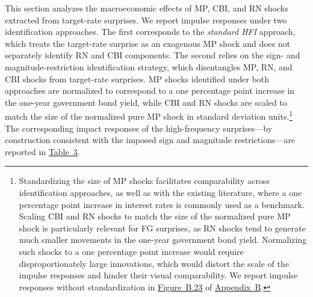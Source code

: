 \documentclass[12pt, reqno]{article}
\begin{document}
This section analyzes the macroeconomic effects of MP, CBI, and RN shocks extracted from target-rate surprises. We report impulse responses under two identification approaches. The first corresponds to the \emph{standard HFI} approach, which treats the target-rate surprise as an exogenous MP shock and does not separately identify RN and CBI components. The second relies on the sign- and magnitude-restriction identification strategy, which disentangles MP, RN, and CBI shocks from target-rate surprises. MP shocks identified under both approaches are normalized to correspond to a one percentage point increase in the one-year government bond yield, while CBI and RN shocks are scaled to match the size of the normalized pure MP shock in standard deviation units.\footnote{Standardizing the size of MP shocks facilitates comparability across identification approaches, as well as with the existing literature, where a one percentage point increase in interest rates is commonly used as a benchmark. Scaling CBI and RN shocks to match the size of the normalized pure MP shock is particularly relevant for FG surprises, as RN shocks tend to generate much smaller movements in the one-year government bond yield. Normalizing such shocks to a one percentage point increase would require disproportionately large innovations, which would distort the scale of the impulse responses and hinder their visual comparability. We report impulse responses without standardization in \hyperlink{Figure B.23}{Figure~B.23} of \hyperlink{Appendix B}{Appendix~B}.} The corresponding impact responses of the high-frequency surprises—by construction consistent with the imposed sign and magnitude restrictions—are reported in \hyperlink{Table 3}{Table~3}.
\end{document}
